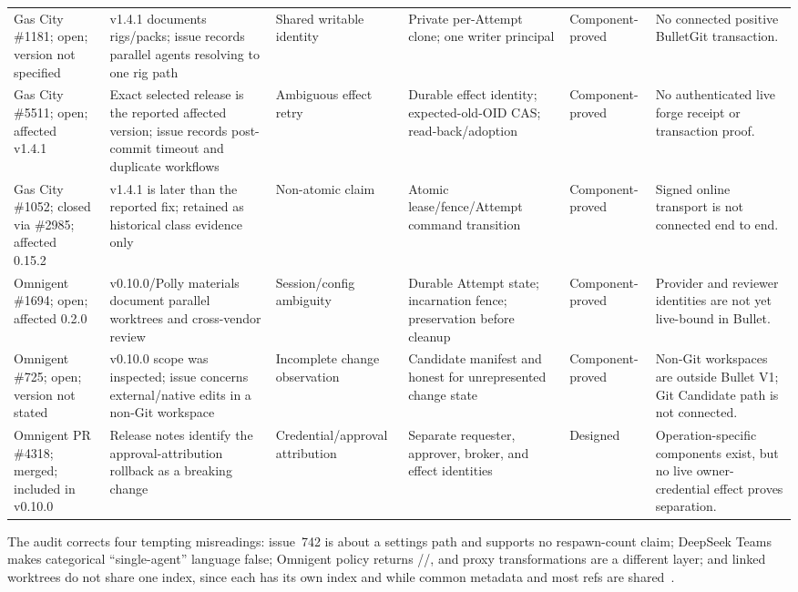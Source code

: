 \documentclass[journal]{IEEEtran}
\newcommand{\Designed}{\textsf{Designed}}
\newcommand{\ComponentProved}{\textsf{Component-proved}}
\newcommand{\code}[1]{\texttt{\detokenize{#1}}}
\begin{document}
\begin{table}[!t]
\begin{tabularx}{\textwidth}{@{}p{}p{}p{}p{}p{}X@{}}
Gas City \#1181; open; version not specified~\cite{gascity1181} & v1.4.1 documents rigs/packs; issue records parallel agents resolving to one rig path & Shared writable identity & Private per-Attempt clone; one writer principal & \ComponentProved & No connected positive BulletGit transaction. \\
Gas City \#5511; open; affected v1.4.1~\cite{gascity5511} & Exact selected release is the reported affected version; issue records post-commit timeout and duplicate workflows & Ambiguous effect retry & Durable effect identity; expected-old-OID CAS; read-back/adoption & \ComponentProved & No authenticated live forge receipt or transaction proof. \\
Gas City \#1052; closed via \#2985; affected 0.15.2~\cite{gascity1052} & v1.4.1 is later than the reported fix; retained as historical class evidence only & Non-atomic claim & Atomic lease/fence/Attempt command transition & \ComponentProved & Signed online transport is not connected end to end. \\
Omnigent \#1694; open; affected 0.2.0~\cite{omnigent1694} & v0.10.0/Polly materials document parallel worktrees and cross-vendor review & Session/config ambiguity & Durable Attempt state; incarnation fence; preservation before cleanup & \ComponentProved & Provider and reviewer identities are not yet live-bound in Bullet. \\
Omnigent \#725; open; version not stated~\cite{omnigent725} & v0.10.0 scope was inspected; issue concerns external/native edits in a non-Git workspace & Incomplete change observation & Candidate manifest and honest \code{UNKNOWN} for unrepresented change state & \ComponentProved & Non-Git workspaces are outside Bullet V1; Git Candidate path is not connected. \\
Omnigent PR \#4318; merged; included in v0.10.0~\cite{omnigent4318,omnigentV010} & Release notes identify the approval-attribution rollback as a breaking change & Credential/approval attribution & Separate requester, approver, broker, and effect identities & \Designed & Operation-specific components exist, but no live owner-credential effect proves separation. \\
\bottomrule
\end{tabularx}
\end{table}

The audit corrects four tempting misreadings: issue~742 is about a settings
path and supports no respawn-count claim; DeepSeek Teams makes categorical
``single-agent'' language false; Omnigent policy returns
\code{ALLOW}/\code{DENY}/\code{ASK}, and proxy transformations are a different
layer; and linked worktrees do not share one index, since each has its own
index and \code{HEAD} while common metadata and most refs are
shared~\cite{gitWorktree}.
\end{document}
